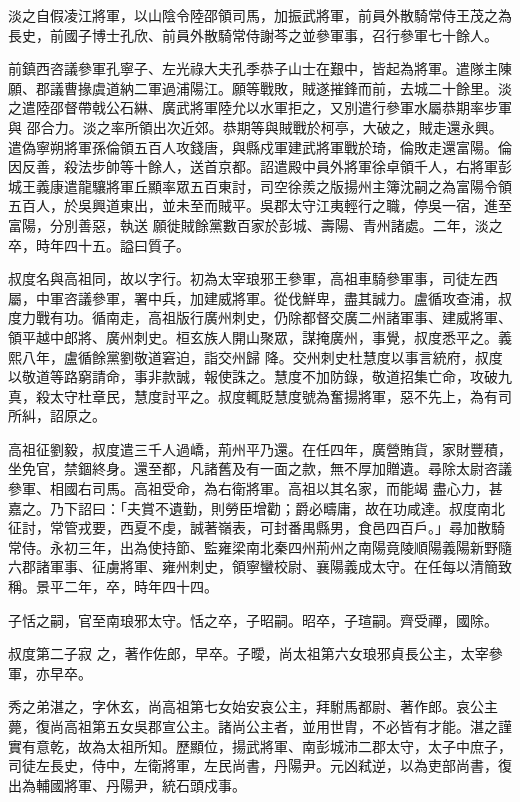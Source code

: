 \begin{pinyinscope}
 淡之自假凌江將軍，以山陰令陸邵領司馬，加振武將軍，前員外散騎常侍王茂之為長史，前國子博士孔欣、前員外散騎常侍謝芩之並參軍事，召行參軍七十餘人。



 前鎮西咨議參軍孔寧子、左光祿大夫孔季恭子山士在艱中，皆起為將軍。遣隊主陳願、郡議曹掾虞道納二軍過浦陽江。願等戰敗，賊遂摧鋒而前，去城二十餘里。淡之遣陸邵督帶戟公石綝、廣武將軍陸允以水軍拒之，又別遣行參軍水屬恭期率步軍與
 邵合力。淡之率所領出次近郊。恭期等與賊戰於柯亭，大破之，賊走還永興。遣偽寧朔將軍孫倫領五百人攻錢唐，與縣戍軍建武將軍戰於琦，倫敗走還富陽。倫因反善，殺法步帥等十餘人，送首京都。詔遣殿中員外將軍徐卓領千人，右將軍彭城王義康遣龍驤將軍丘顯率眾五百東討，司空徐羨之版揚州主簿沈嗣之為富陽令領五百人，於吳興道東出，並未至而賊平。吳郡太守江夷輕行之職，停吳一宿，進至富陽，分別善惡，執送
 願徙賊餘黨數百家於彭城、壽陽、青州諸處。二年，淡之卒，時年四十五。謚曰質子。



 叔度名與高祖同，故以字行。初為太宰琅邪王參軍，高祖車騎參軍事，司徒左西屬，中軍咨議參軍，署中兵，加建威將軍。從伐鮮卑，盡其誠力。盧循攻查浦，叔度力戰有功。循南走，高祖版行廣州刺史，仍除都督交廣二州諸軍事、建威將軍、領平越中郎將、廣州刺史。桓玄族人開山聚眾，謀掩廣州，事覺，叔度悉平之。義熙八年，盧循餘黨劉敬道窘迫，詣交州歸
 降。交州刺史杜慧度以事言統府，叔度以敬道等路窮請命，事非款誠，報使誅之。慧度不加防錄，敬道招集亡命，攻破九真，殺太守杜章民，慧度討平之。叔度輒貶慧度號為奮揚將軍，惡不先上，為有司所糾，詔原之。



 高祖征劉毅，叔度遣三千人過嶠，荊州平乃還。在任四年，廣營賄貨，家財豐積，坐免官，禁錮終身。還至都，凡諸舊及有一面之款，無不厚加贈遺。尋除太尉咨議參軍、相國右司馬。高祖受命，為右衛將軍。高祖以其名家，而能竭
 盡心力，甚嘉之。乃下詔曰：「夫賞不遺勤，則勞臣增勸；爵必疇庸，故在功咸達。叔度南北征討，常管戎要，西夏不虔，誠著嶺表，可封番禺縣男，食邑四百戶。」尋加散騎常侍。永初三年，出為使持節、監雍梁南北秦四州荊州之南陽竟陵順陽義陽新野隨六郡諸軍事、征虜將軍、雍州刺史，領寧蠻校尉、襄陽義成太守。在任每以清簡致稱。景平二年，卒，時年四十四。



 子恬之嗣，官至南琅邪太守。恬之卒，子昭嗣。昭卒，子瑄嗣。齊受禪，國除。



 叔度第二子寂
 之，著作佐郎，早卒。子曖，尚太祖第六女琅邪貞長公主，太宰參軍，亦早卒。



 秀之弟湛之，字休玄，尚高祖第七女始安哀公主，拜駙馬都尉、著作郎。哀公主薨，復尚高祖第五女吳郡宣公主。諸尚公主者，並用世胄，不必皆有才能。湛之謹實有意乾，故為太祖所知。歷顯位，揚武將軍、南彭城沛二郡太守，太子中庶子，司徒左長史，侍中，左衛將軍，左民尚書，丹陽尹。元凶弒逆，以為吏部尚書，復出為輔國將軍、丹陽尹，統石頭戍事。




\end{pinyinscope}

